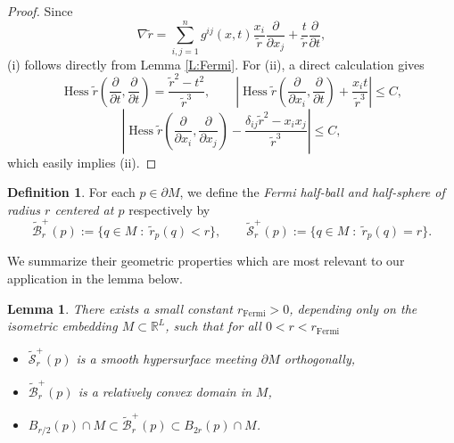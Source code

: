 \documentclass[10pt]{amsart}
\newtheorem{lemma}[theorem]{Lemma}
\theoremstyle{definition}
\newtheorem{definition}[theorem]{Definition}
\theoremstyle{remark}
\numberwithin{equation}{section}
\newcommand{\tBcal}{\widetilde{\mathcal{B}}}
\newcommand{\tScal}{\widetilde{\mathcal{S}}}
\newcommand{\tir}{\widetilde{r}}
\newcommand{\Hess}{\operatorname{Hess}}
\begin{document}
\begin{proof}
Since 
\begin{equation}
\label{E:grad-rtilde}
\nabla \tir = \sum_{i,j=1}^n g^{ij}(x,t) \frac{x_i}{\tir} \frac{\partial}{\partial x_j} +\frac{t}{\tir} \frac{\partial}{\partial t},
\end{equation}
(i) follows directly from Lemma \ref{L:Fermi}. For (ii), a direct calculation gives
\[ \Hess \tir \left(\frac{\partial}{\partial t}, \frac{\partial}{\partial t}\right) = \frac{\tir^2-t^2}{\tir^3}, \qquad \left| \Hess \tir \left(\frac{\partial}{\partial x_i}, \frac{\partial}{\partial t}\right) + \frac{x_i t}{\tir^3} \right| \leq C, \]
\[ \left| \Hess \tir \left(\frac{\partial}{\partial x_i}, \frac{\partial}{\partial x_j}\right)- \frac{\delta_{ij} \tir^2-x_i x_j}{\tir^3}\right| \leq C, \]
which easily implies (ii).
\end{proof}

\begin{definition}
\label{D:Fermi-balls}
For each $p \in \partial M$, we define the \emph{Fermi half-ball and half-sphere of radius $r$ centered at $p$} respectively by
\[ \tBcal^+_r(p):= \{ q \in M \; : \; \tir_p(q) < r \}, \qquad \tScal^+_r(p):=\{ q \in M \; : \; \tir_p(q) = r \}.\]
\end{definition}

We summarize their geometric properties which are most relevant to our application in the lemma below. 



\begin{lemma}
\label{L:Fermi-convex}
There exists a small constant $r_{\textrm{Fermi}}>0$, depending only on the isometric embedding $M \subset \mathbb{R}^L$, such that for all $0<r<r_{\textrm{Fermi}}$
\begin{itemize}
\item $\tScal^+_r(p)$ is a smooth hypersurface meeting $\partial M$ orthogonally,
\item $\tBcal^+_r(p)$ is a relatively convex domain in $M$,
\item $B_{r/2}(p) \cap M \subset \tBcal^+_r(p) \subset B_{2r}(p) \cap M$.
\end{itemize}
\end{lemma}
\end{document}
